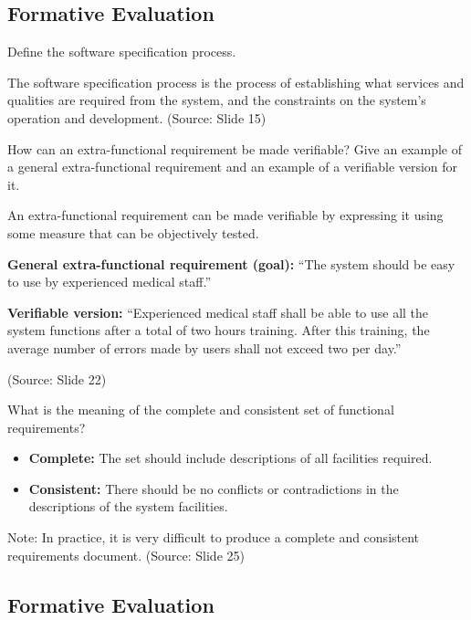 \documentclass[12pt]{article}
\begin{document}
\subsection{Formative Evaluation}

\begin{questionbox}
Define the software specification process.
\end{questionbox}

The software specification process is the process of establishing what services and qualities are required from the system, and the constraints on the system's operation and development.
(Source: Slide 15)

\begin{questionbox}
How can an extra-functional requirement be made verifiable? Give an example of a general extra-functional requirement and an example of a verifiable version for it.
\end{questionbox}

An extra-functional requirement can be made verifiable by expressing it using some measure that can be objectively tested.

\textbf{General extra-functional requirement (goal):}
``The system should be easy to use by experienced medical staff.''

\textbf{Verifiable version:}
``Experienced medical staff shall be able to use all the system functions after a total of two hours training. After this training, the average number of errors made by users shall not exceed two per day.''

(Source: Slide 22)

\begin{questionbox}
What is the meaning of the complete and consistent set of functional requirements?
\end{questionbox}

\begin{itemize}
    \item \textbf{Complete:} The set should include descriptions of all facilities required.
    \item \textbf{Consistent:} There should be no conflicts or contradictions in the descriptions of the system facilities.
\end{itemize}

Note: In practice, it is very difficult to produce a complete and consistent requirements document.
(Source: Slide 25)

\subsection{Formative Evaluation}
\end{document}
